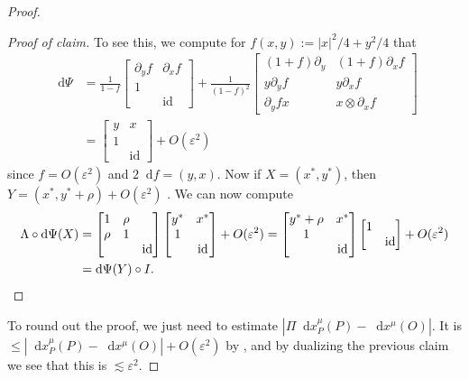 \documentclass[reqno,10pt]{amsart}
\DeclareMathOperator{\id}{id}
\newcommand*\dif{\mathop{}\!\mathrm{d}}
\theoremstyle{definition}
\numberwithin{equation}{section}
\begin{document}
\begin{proof}
\begin{proof}[Proof of claim]
To see this, we compute for $f(x, y) := |x|^2/4 + y^2/4$ that
\begin{align*}
\dif \Psi &= \frac{1}{1 - f} \begin{bmatrix} \partial_y f & \partial_x f \\ 1 \\ & \id \end{bmatrix} + \frac{1}{(1 - f)^2} \begin{bmatrix}(1 + f) \partial_y & (1 + f) \partial_x f \\
y \partial_y f & y \partial_x f \\
\partial_y f x & x \otimes \partial_x f
\end{bmatrix} \\
&= \begin{bmatrix}y & x \\ 1 \\ & \id \end{bmatrix} + O(\varepsilon^2)
\end{align*}
since $f = O(\varepsilon^2)$ and $2\dif f = (y, x)$. Now if $X = (x^*, y^*)$, then $Y = (x^*, y^* + \rho) + O(\varepsilon^2)$ \cite[(4.5.5)]{ratcliffe2006foundations}.
We can now compute 
\begin{align*}
\Lambda \circ \dif \Psi(X) &= \begin{bmatrix}1 & \rho \\ \rho & 1 \\ && \id \end{bmatrix} \begin{bmatrix}y^* & x^* \\ 1 \\ & \id \end{bmatrix} + O(\varepsilon^2) = \begin{bmatrix}y^* + \rho & x^* \\ 1 \\ & \id\end{bmatrix} \begin{bmatrix}1 \\ & \id\end{bmatrix} + O(\varepsilon^2) \\
&= \dif \Psi(Y) \circ I. \qedhere
\end{align*}
\end{proof}

To round out the proof, we just need to estimate $|\Pi \dif x^\mu_P(P) - \dif x^\mu(O)|$.
It is $\leq |\dif x^\mu_P(P) - \dif x^\mu(O)| + O(\varepsilon^2)$ by \cite[Lemma 4.2]{daskalopoulosPrep1}, and by dualizing the previous claim we see that this is $\lesssim \varepsilon^2$.
\end{proof}
\end{document}

